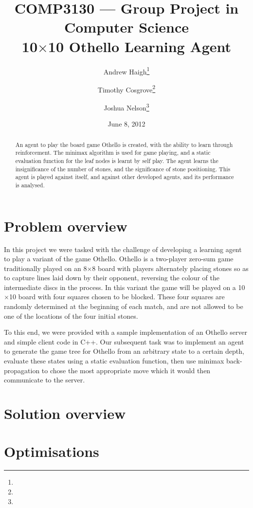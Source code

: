 \documentclass[11pt]{article}
\title{%
  COMP3130 --- Group Project in Computer Science \\
  10$\times$10 Othello Learning Agent}
\date{June 8, 2012}
\author{%
  Andrew Haigh\thanks{\uid{u4667010}} \and
  Timothy Cosgrove\thanks{\uid{u4843619}} \and
  Joshua Nelson\thanks{\uid{u4850020}}}
\begin{document}
\maketitle
\begin{abstract}
  \label{abstract}
  An agent to play the board game Othello is created, with the ability
  to learn through reinforcement. The minimax algorithm is used for game
  playing, and a static evaluation function for the leaf nodes is learnt by
  self play.  The agent learns the insignificance of the number of stones, and
  the significance of stone positioning. This agent is played against itself,
  and against other developed agents, and its performance is analysed.
\end{abstract}
\clearpage

\section{Problem overview}
\label{sec:problem_overview}
In this project we were tasked with the challenge of developing a learning
agent to play a variant of the game Othello. Othello is a two-player zero-sum
game traditionally played on an 8$\times$8 board with players alternately
placing stones so as to capture lines laid down by their opponent, reversing
the colour of the intermediate discs in the process.
In this variant the game will be played on a 10$\times$10 board with four
squares chosen to be blocked. These four squares are randomly determined at
the beginning of each match, and are not allowed to be one of the
locations of the four initial stones.

To this end, we were provided with a sample implementation of an Othello
server and simple client code in C++. Our subsequent task was to implement an
agent to generate the game tree for Othello from an arbitrary state to a
certain depth, evaluate these states using a static evaluation function, then
use minimax back-propagation to chose the most appropriate move which it would
then communicate to the server.

\section{Solution overview}
\label{sec:solution_overview}

\section{Optimisations}
\label{sec:optimisations}
\end{document}
